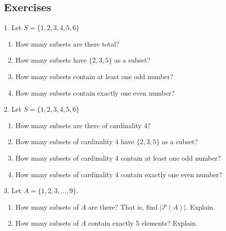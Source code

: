 \documentclass[10pt,]{book}
\theoremstyle{plain}
\theoremstyle{definition}
\theoremstyle{definition}
\theoremstyle{definition}
\theoremstyle{definition}
\numberwithin{equation}{chapter}
\newcommand{\pow}{\mathcal P}
\begin{document}
\subsection[{Exercises}]{Exercises}\label{exercises_counting-binom}
\begin{exerciselist}
\item[1.]\hypertarget{exercise-98}{}\hypertarget{p-835}{}%
Let \(S = \{1, 2, 3, 4, 5, 6\}\) \leavevmode%
\begin{enumerate}[label=(\alph*)]
\item\hypertarget{li-380}{}\hypertarget{p-836}{}%
How many subsets are there total?%
\item\hypertarget{li-381}{}\hypertarget{p-837}{}%
How many subsets have \(\{2,3,5\}\) as a subset?%
\item\hypertarget{li-382}{}\hypertarget{p-838}{}%
How many subsets contain at least one odd number?%
\item\hypertarget{li-383}{}\hypertarget{p-839}{}%
How many subsets contain exactly one even number?%
\end{enumerate}
%
\par\smallskip
\item[2.]\hypertarget{exercise-99}{}\hypertarget{p-841}{}%
Let \(S = \{1, 2, 3, 4, 5, 6\}\) \leavevmode%
\begin{enumerate}[label=(\alph*)]
\item\hypertarget{li-388}{}\hypertarget{p-842}{}%
How many subsets are there of cardinality 4?%
\item\hypertarget{li-389}{}\hypertarget{p-843}{}%
How many subsets of cardinality 4 have \(\{2,3,5\}\) as a subset?%
\item\hypertarget{li-390}{}\hypertarget{p-844}{}%
How many subsets of cardinality 4 contain at least one odd number?%
\item\hypertarget{li-391}{}\hypertarget{p-845}{}%
How many subsets of cardinality 4 contain exactly one even number?%
\end{enumerate}
%
\par\smallskip
\item[3.]\hypertarget{exercise-100}{}\hypertarget{p-847}{}%
Let \(A = \{1,2,3,\ldots,9\}\). \leavevmode%
\begin{enumerate}[label=(\alph*)]
\item\hypertarget{li-396}{}\hypertarget{p-848}{}%
How many subsets of \(A\) are there? That is, find \(|\pow(A)|\). Explain. %
\item\hypertarget{li-397}{}\hypertarget{p-849}{}%
How many subsets of \(A\) contain exactly 5 elements? Explain. %

\end{enumerate}
\end{exerciselist}
\end{document}
